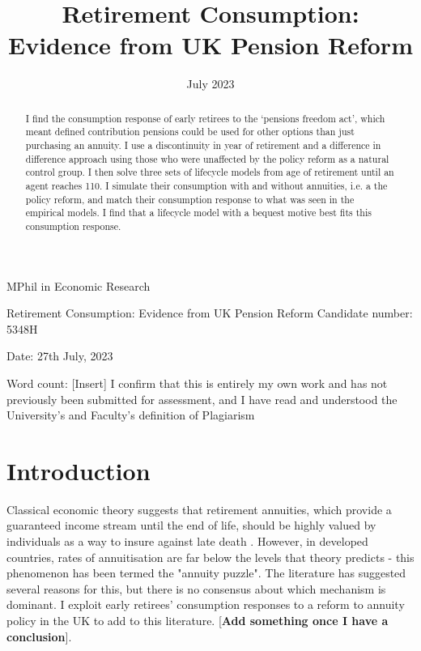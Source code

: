 \documentclass[12pt]{article}
\date{July 2023}
\title{Retirement Consumption: Evidence from UK Pension Reform}
\begin{document}
\begin{titlepage}
    \begin{center}

        \normalsize
        {MPhil in Economic Research}
        \vfill

        \huge
        Retirement Consumption: Evidence from UK Pension Reform
        \vfill
        \normalsize
        Candidate number: 5348H

        Date: 27th July, 2023

        Word count: [Insert]
        \vfill
        I confirm that this is entirely my own work and has not previously been submitted for assessment, and I have read and understood the University’s and Faculty’s definition of Plagiarism
    \end{center}
\end{titlepage}
\newpage
\maketitle
\begin{abstract}
    I find the consumption response of early retirees to the `pensions freedom
    act', which meant defined contribution pensions could be used for other
    options than just purchasing an annuity. I use a discontinuity in year of
    retirement and a difference in difference approach using those who were
    unaffected by the policy reform as a natural control group. I then solve
    three sets of lifecycle models from age of retirement until an agent reaches
    110. I simulate their consumption with and without annuities, i.e. a the
    policy reform, and match their consumption response to what was seen in the
    empirical models. I find that a lifecycle model with a bequest motive best
    fits this consumption response.
\end{abstract}
\newpage
\tableofcontents
\newpage

\section{Introduction}
Classical economic theory suggests that retirement annuities, which provide a
guaranteed income stream until the end of life, should be highly valued by
individuals as a way to insure against late death \cite{yaari_65}. However, in
developed countries, rates of annuitisation are far below the levels that theory
predicts - this phenomenon has been termed the "annuity puzzle". The literature
has suggested several reasons for this, but there is no consensus about which
mechanism is dominant. I exploit early retirees' consumption responses to a
reform to annuity policy in the UK to add to this literature. [\textbf{Add
            something once I have a conclusion}].
\end{document}

